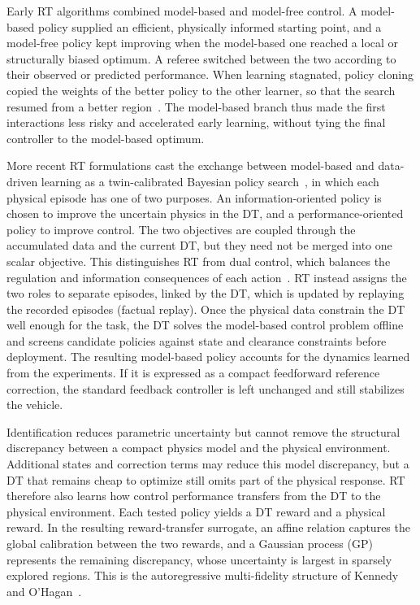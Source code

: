 \documentclass[journal]{IEEEtran}
\begin{document}
Early RT algorithms combined model-based and model-free control. A model-based policy supplied an efficient, physically informed starting point, and a model-free policy kept improving when the model-based one reached a local or structurally biased optimum. A referee switched between the two according to their observed or predicted performance. When learning stagnated, policy cloning copied the weights of the better policy to the other learner, so that the search resumed from a better region~\cite{SchenaRT2023,PolettiRT2025}. The model-based branch thus made the first interactions less risky and accelerated early learning, without tying the final controller to the model-based optimum.

More recent RT formulations cast the exchange between model-based and data-driven learning as a twin-calibrated Bayesian policy search~\cite{Mendez2026}, in which each physical episode has one of two purposes. An information-oriented policy is chosen to improve the uncertain physics in the DT, and a performance-oriented policy to improve control. The two objectives are coupled through the accumulated data and the current DT, but they need not be merged into one scalar objective. This distinguishes RT from dual control, which balances the regulation and information consequences of each action~\cite{Feldbaum1960,Filatov2000,Mesbah2018}. RT instead assigns the two roles to separate episodes, linked by the DT, which is updated by replaying the recorded episodes (factual replay). Once the physical data constrain the DT well enough for the task, the DT solves the model-based control problem offline and screens candidate policies against state and clearance constraints before deployment. The resulting model-based policy accounts for the dynamics learned from the experiments. If it is expressed as a compact feedforward reference correction, the standard feedback controller is left unchanged and still stabilizes the vehicle.

Identification reduces parametric uncertainty but cannot remove the structural discrepancy between a compact physics model and the physical environment. Additional states and correction terms may reduce this model discrepancy, but a DT that remains cheap to optimize still omits part of the physical response. RT therefore also learns how control performance transfers from the DT to the physical environment. Each tested policy yields a DT reward and a physical reward. In the resulting reward-transfer surrogate, an affine relation captures the global calibration between the two rewards, and a Gaussian process (GP) represents the remaining discrepancy, whose uncertainty is largest in sparsely explored regions. This is the autoregressive multi-fidelity structure of Kennedy and O'Hagan~\cite{Kennedy2000,Kennedy2001,Forrester2007,Rasmussen2006}.
\end{document}

